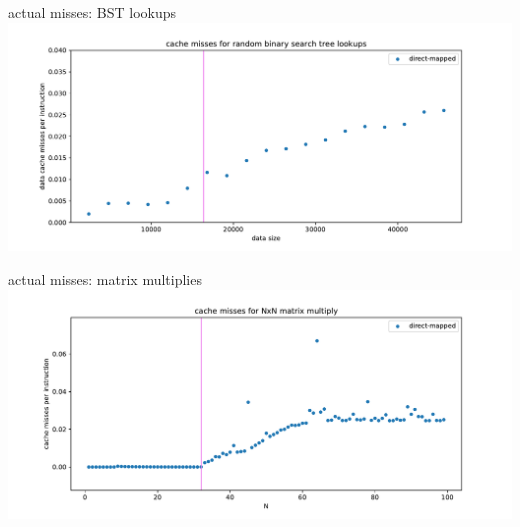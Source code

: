 \begin{frame}{actual misses: BST lookups}
\includegraphics[width=\textwidth]{../caching/bst-one}
\end{frame}

\begin{frame}{actual misses: matrix multiplies}
\includegraphics[width=\textwidth]{../caching/mm-one}
\end{frame}
